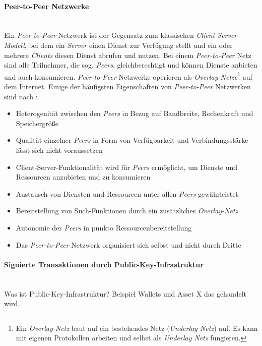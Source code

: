 \paragraph{Peer-to-Peer Netzwerke}$~~$\\
Ein \textit{Peer-to-Peer} Netzwerk ist der Gegensatz zum klassischen \textit{Client-Server-Modell}, bei dem ein \textit{Server} einen Dienst zur Verfügung stellt und ein oder mehrere \textit{Clients} diesen Dienst abrufen und nutzen. Bei einem \textit{Peer-to-Peer} Netz sind alle Teilnehmer, die sog. \textit{Peers}, gleichberechtigt und können Dienste anbieten und auch konsumieren. \textit{Peer-to-Peer} Netzwerke operieren als \textit{Overlay-Netze}\footnote{Ein \textit{Overlay-Netz} baut auf ein bestehendes Netz (\textit{Underlay Netz}) auf. Es kann mit eigenen Protokollen arbeiten und selbst als \textit{Underlay Netz} fungieren.\citep{Andersen2001}} auf dem Internet. Einige der häufigsten Eigenschaften von \textit{Peer-to-Peer} Netzwerken sind nach \citet{Steinmetz2005}:

\begin{itemize}
  \item Heterogenität zwischen den \textit{Peers} in Bezug auf Bandbreite, Rechenkraft und Speichergröße
  \item Qualität einzelner \textit{Peers} in Form von Verfügbarkeit und Verbindungsstärke lässt sich nicht voraussetzen
  \item Client-Server-Funktionalität wird für \textit{Peers} ermöglicht, um Dienste und Ressourcen anzubieten und zu konsumieren
  \item Austausch von Diensten und Ressourcen unter allen \textit{Peers} gewährleistet
  \item Bereitstellung von Such-Funktionen durch ein zusätzliches \textit{Overlay-Netz}
  \item Autonomie der \textit{Peers} in punkto Ressourcenbereitstellung
  \item Das \textit{Peer-to-Peer} Netzwerk organisiert sich selbst und nicht durch Dritte
\end{itemize}

\paragraph{Signierte Transaktionen durch Public-Key-Infrastruktur}$~~$\\
Was ist Public-Key-Infrastruktur?
Beispiel Wallets und Asset X das gehandelt wird.
\citep{Beutelspacher2010}
\citep{Menezes1997}

